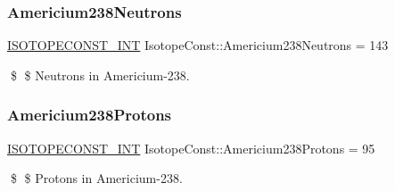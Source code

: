 \subsubsection{\texorpdfstring{Americium238\+Neutrons}{Americium238Neutrons}}
{\footnotesize\ttfamily \mbox{\hyperlink{group___isotope_const-_macros_ga5f18360b3e99483a35c32d789e62621c}{I\+S\+O\+T\+O\+P\+E\+C\+O\+N\+S\+T\+\_\+\+I\+NT}} Isotope\+Const\+::\+Americium238\+Neutrons = 143}

\$ \$ Neutrons in Americium-\/238. \mbox{\label{group___isotope_const-_americium-_am238_ga6bbe7a3de3ba2c63cc3b370e14323937}} 
\subsubsection{\texorpdfstring{Americium238\+Protons}{Americium238Protons}}
{\footnotesize\ttfamily \mbox{\hyperlink{group___isotope_const-_macros_ga5f18360b3e99483a35c32d789e62621c}{I\+S\+O\+T\+O\+P\+E\+C\+O\+N\+S\+T\+\_\+\+I\+NT}} Isotope\+Const\+::\+Americium238\+Protons = 95}

\$ \$ Protons in Americium-\/238. 